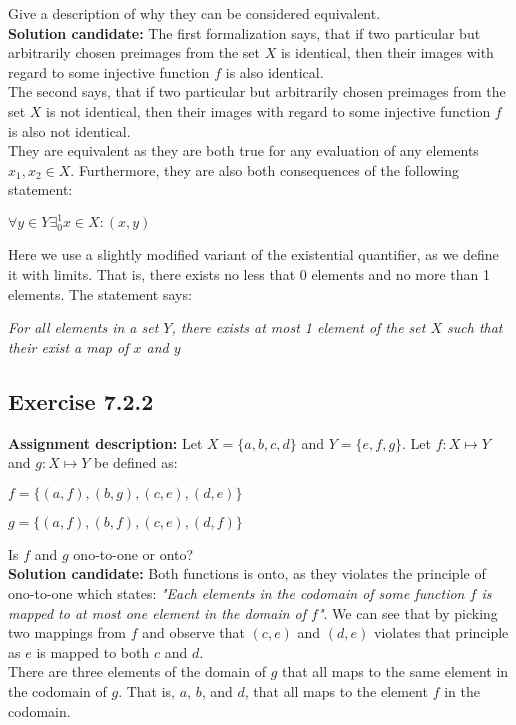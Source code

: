 \documentclass{report}
\newcommand{\cent}[1]{\begin{center}#1\end{center}}
\newcommand{\In}{\! \in \!}
\newcommand{\AssignmentDescription}{\textbf{Assignment description: }}
\newcommand{\Solution}{\textbf{Solution candidate: }}
\newcommand{\Exercise}[1]{\subsection{Exercise #1}}
\begin{document}
 	Give a description of why they can be considered equivalent.\\
 	
 	\Solution
 	The first formalization says, that if two particular but arbitrarily chosen preimages from the set $X$ is identical, then their images with regard to some injective function $f$ is also identical.\\
 	
 	The second says, that if two particular but arbitrarily chosen preimages from the set $X$ is not identical, then their images with regard to some injective function $f$ is also not identical.\\
 	
 	They are equivalent as they are both true for any evaluation of any elements $x_1,x_2 \In X$. Furthermore, they are also both consequences of the following statement:
 	
 	\cent{$\forall y \In Y \exists_0^1 x \In X : (x,y)$} 	
 	 
 	 Here we use a slightly modified variant of the existential quantifier, as we define it with limits. That is, there exists no less that 0 elements and no more than 1 elements. The statement says:
 	 
 	 \begin{center}
 	 	\textit{For all elements in a set $Y$, there exists at most 1 element of the set $X$ such that their exist a map of  $x$  and $y$}
 	 \end{center}
 	
 	\Exercise{7.2.2}
 	
 	\AssignmentDescription
 	Let $X = \{a,b,c,d\}$ and $Y = \{e,f,g\}$. Let $f : X \mapsto Y$ and $g : X \mapsto Y$ be defined as:
 	
 	\cent{$f = \{(a,f),(b,g),(c,e), (d,e)\}$}
 	\cent{$g = \{(a,f),(b,f),(c,e), (d,f)\}$}
 	
 	Is $f$ and $g$ ono-to-one or onto?\\
 	
 	\Solution
 	Both functions is onto, as they violates the principle of ono-to-one which states: \textit{"Each elements in the codomain of some function $f$ is mapped to at most one element in the domain of $f$"}. We can see that by picking two mappings from $f$ and observe that $(c,e)$ and $(d,e)$ violates that principle as $e$ is mapped to both $c$ and $d$.\\
 	
 	There are three elements of the domain of $g$ that all maps to the same element in the codomain of $g$. That is, $a$, $b$, and $d$, that all maps to the element $f$ in the codomain.
 	
\end{document}
